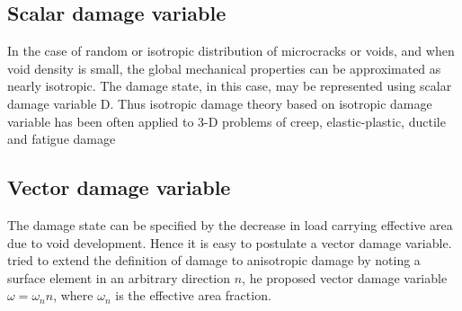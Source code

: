 \documentclass[12pt,openright,twoside]{report}
\begin{document}
\subsection{Scalar damage variable}
\indent\indent\indent In the case of random or isotropic distribution of microcracks or voids, and when void density is small, the global mechanical properties can be approximated as nearly isotropic. The damage state, in this case, may be represented using scalar damage variable D. Thus isotropic damage theory based on isotropic damage variable has been often applied to 3-D problems of creep, elastic-plastic, ductile and fatigue damage \citep{lemaitre2012course}
\subsection{Vector damage variable}
\indent\indent\indent The damage state can be specified by the decrease in load carrying effective area due to void development. Hence it is easy to postulate a vector damage variable.  \citep{kachanov1986introduction} tried to extend the definition of damage to anisotropic damage by noting a surface element in an arbitrary direction $n$, he proposed vector damage variable $ \omega = \omega_{n}n$, where $\omega_{n}$ is the effective area fraction. 
\end{document}
